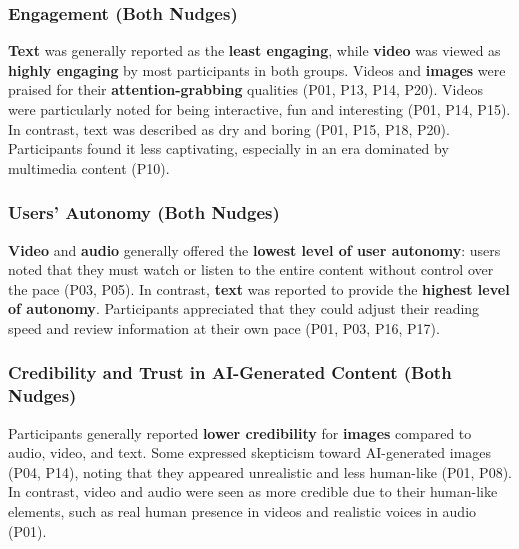 \subsubsection{Engagement (Both Nudges)}
\textbf{Text} was generally reported as the \textbf{least engaging}, while \textbf{video} was viewed as \textbf{highly engaging} by most participants in both groups. Videos and \textbf{images} were praised for their \textbf{attention-grabbing} qualities (P01, P13, P14, P20). Videos were particularly noted for being interactive, fun and interesting (P01, P14, P15).
In contrast, text was described as dry and boring (P01, P15, P18, P20). Participants found it less captivating, especially in an era dominated by multimedia content (P10). %

\subsubsection{Users' Autonomy (Both Nudges)}
\textbf{Video} and \textbf{audio} generally offered the \textbf{lowest level of user autonomy}: users noted that they must watch or listen to the entire content without control over the pace (P03, P05). %
In contrast, \textbf{text} was reported to provide the \textbf{highest level of autonomy}. Participants appreciated that they could adjust their reading speed and review information at their own pace (P01, P03, P16, P17).

\subsubsection{Credibility and Trust in AI-Generated Content (Both Nudges)}
Participants generally reported \textbf{lower credibility} for \textbf{images} compared to audio, video, and text. Some expressed skepticism toward AI-generated images (P04, P14), noting that they appeared unrealistic and less human-like (P01, P08). In contrast, video and audio were seen as more credible due to their human-like elements, such as real human presence in videos and realistic voices in audio (P01).

